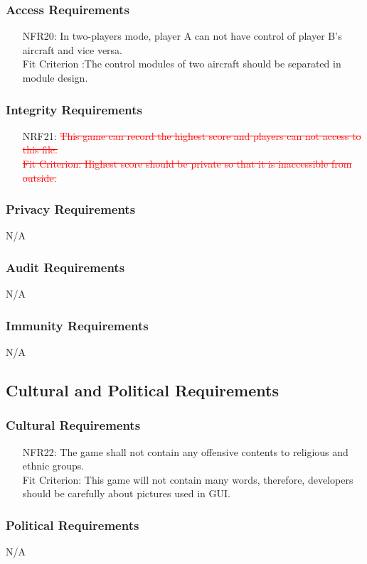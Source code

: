 \documentclass[12pt]{article}
\begin{document}
\subsubsection{Access Requirements}
\begin{itemize}
\item[NFR20:] In two-players mode, player A can not have
control of player B's aircraft and vice versa.\\Fit Criterion
:The control modules of two aircraft should be separated in
module design.
\end{itemize}
\subsubsection{Integrity Requirements}
\begin{itemize}
\item[NRF21:]\textcolor{red}{\st{This game can record the highest score and 
players can not access to this file.\\Fit Criterion: Highest
score should be private so that it is inaccessible from outside.}}
\end{itemize}
\subsubsection{Privacy Requirements}
N/A
\subsubsection{Audit Requirements}
N/A
\subsubsection{Immunity Requirements}
N/A
\subsection{Cultural and Political Requirements}
\subsubsection{Cultural Requirements}
\begin{itemize}
\item[NFR22:]The game shall not contain any offensive contents
to religious and ethnic groups. \\Fit Criterion: This game 
will not contain many words, therefore, developers should be
carefully about pictures used in GUI.
\end{itemize}
\subsubsection{Political Requirements}
N/A
\end{document}
